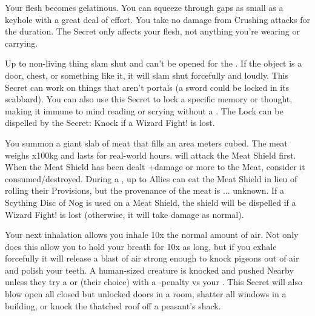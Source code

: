 Your flesh becomes gelatinous. You can squeeze through gaps as small as a keyhole with a great deal of effort. You take no damage from Crushing
attacks for the duration.  The Secret only affects your flesh, not anything you're wearing or carrying.


\WIZARDRY[
  Name=Lock,
  Link=secrets-lock,
  Alignment=Mind,
  Save=Y (negate),
  Duration=\DICE,
  Counter=None ,
  Keywords=None,
  Target=Close and Nearby Objects
]

Up to \DICE non-living thing slam shut and can't be opened for the \Duration. If the object is a door, chest, or something like it, it will slam shut forcefully and loudly. This Secret can work on things that aren't portals (a sword could be locked in its scabbard). You can also use this Secret to lock a specific memory or thought, making it immune to mind reading or scrying without a \RBTRY{\INT}{\INT}.  The Lock can be dispelled by the Secret: Knock if a Wizard Fight! is lost.


\WIZARDRY[
  Name=Meat Shield,
  Link=secrets-meat-shield,
  Alignment=Biomancy,
  Save=N,
  Duration=\DICE real-world hours,
  Counter=None ,
  Keywords=None,
  Target=Close and Nearby
]

You summon a giant slab of meat that fills an area \DICE meters cubed.  The meat weighs \DICE x100kg and lasts for \DICE real-world hours.  will attack the Meat Shield first. When the Meat Shield has been dealt \SUMDICE+\DICE damage or more to the Meat, consider it consumed/destroyed. During a , up to \DICE Allies can eat the Meat Shield in lieu of rolling their Provisions, but the provenance of the meat is ... unknown.  If a Scything Disc of Nog is used on a Meat Shield, the shield will be dispelled if a Wizard Fight! is lost (otherwise, it will take damage as normal).

\WIZARDRY[
  Name=Mighty Lungs,
  Link=secrets-mighty-lungs,
  Alignment=Biomancy,
  Save=N,
  Duration=Until exhalation,
  Counter=None ,
  Keywords=Contested,
  Target=Self
]

Your next inhalation allows you inhale 10x the normal amount of air. Not only does this allow you to hold your breath for 10x as long, but if you
exhale forcefully it will release a blast of air strong enough to knock pigeons out of air and polish your teeth. A human-sized creature is knocked
 and pushed Nearby unless they try a \RB \DEX or \VIG (their choice) with a -\DICE penalty vs your \INT.  This Secret will also blow open all closed but unlocked doors in a room, shatter all windows in a building, or knock the thatched roof off a peasant's shack.

